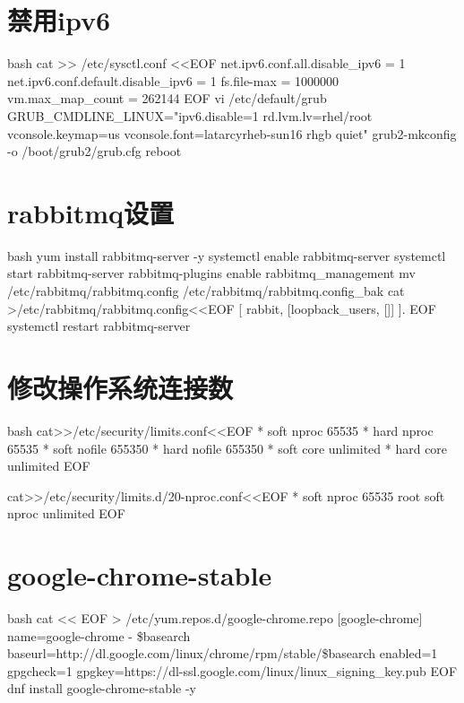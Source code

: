 \section{禁用ipv6}
\begin{code-block}{bash}
cat >> /etc/sysctl.conf <<EOF
net.ipv6.conf.all.disable_ipv6 = 1
net.ipv6.conf.default.disable_ipv6 = 1
fs.file-max = 1000000
vm.max_map_count = 262144
EOF
vi /etc/default/grub
GRUB_CMDLINE_LINUX="ipv6.disable=1 rd.lvm.lv=rhel/root vconsole.keymap=us vconsole.font=latarcyrheb-sun16 rhgb quiet"
grub2-mkconfig -o /boot/grub2/grub.cfg
reboot
\end{code-block}

\section{rabbitmq设置}
\begin{code-block}{bash}
yum install rabbitmq-server -y
systemctl enable rabbitmq-server
systemctl start rabbitmq-server
rabbitmq-plugins enable rabbitmq_management
mv /etc/rabbitmq/rabbitmq.config /etc/rabbitmq/rabbitmq.config_bak
cat >/etc/rabbitmq/rabbitmq.config<<EOF
[
{rabbit, [{loopback_users, []}]}
].
EOF
systemctl restart rabbitmq-server
\end{code-block}

\section{修改操作系统连接数}
\begin{code-block}{bash}
cat>>/etc/security/limits.conf<<EOF
*               soft    nproc           65535
*               hard    nproc           65535
*               soft    nofile          655350
*               hard    nofile          655350
*               soft    core            unlimited
*               hard    core            unlimited
EOF

cat>>/etc/security/limits.d/20-nproc.conf<<EOF
*          soft    nproc     65535
root       soft    nproc     unlimited
EOF
\end{code-block}

\section{google-chrome-stable}
\begin{code-block}{bash}
cat << EOF > /etc/yum.repos.d/google-chrome.repo
[google-chrome]
name=google-chrome - \$basearch
baseurl=http://dl.google.com/linux/chrome/rpm/stable/\$basearch
enabled=1
gpgcheck=1
gpgkey=https://dl-ssl.google.com/linux/linux_signing_key.pub
EOF
dnf install google-chrome-stable -y
\end{code-block}

